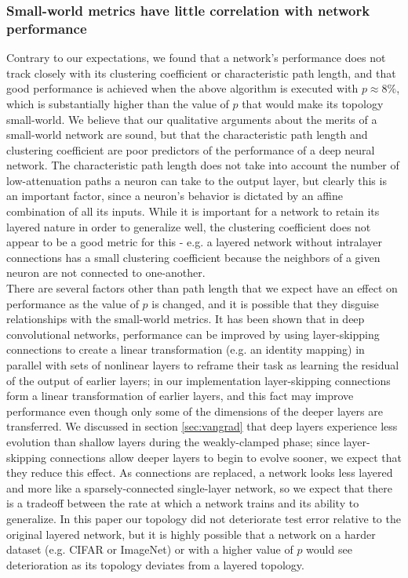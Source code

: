 \documentclass{article}
\newcommand{\npar}{\\\indent}
\begin{document}
\subsubsection{Small-world metrics have little correlation with network performance}
Contrary to our expectations, we found that a network's performance does not track closely with its clustering coefficient or characteristic path length, and that good performance is achieved when the above algorithm is executed with $p\approx 8\%$, which is substantially higher than the value of $p$ that would make its topology small-world. We believe that our qualitative arguments about the merits of a small-world network are sound, but that the characteristic path length and clustering coefficient are poor predictors of the performance of a deep neural network. The characteristic path length does not take into account the number of low-attenuation paths a neuron can take to the output layer, but clearly this is an important factor, since a neuron's behavior is dictated by an affine combination of all its inputs. While it is important for a network to retain its layered nature in order to generalize well, the clustering coefficient does not appear to be a good metric for this - e.g. a layered network without intralayer connections has a small clustering coefficient because the neighbors of a given neuron are not connected to one-another.
\npar
There are several factors other than path length that we expect have an effect on performance as the value of $p$ is changed, and it is possible that they disguise relationships with the small-world metrics. It has been shown \cite{he2015} that in deep convolutional networks, performance can be improved by using layer-skipping connections to create a linear transformation (e.g. an identity mapping) in parallel with sets of nonlinear layers to reframe their task as learning the residual of the output of earlier layers; in our implementation layer-skipping connections form a linear transformation of earlier layers, and this fact may improve performance even though only some of the dimensions of the deeper layers are transferred. We discussed in section \ref{sec:vangrad} that deep layers experience less evolution than shallow layers during the weakly-clamped phase; since layer-skipping connections allow deeper layers to begin to evolve sooner, we expect that they reduce this effect. As connections are replaced, a network looks less layered and more like a sparsely-connected single-layer network, so we expect that there is a tradeoff between the rate at which a network trains and its ability to generalize. In this paper our topology did not deteriorate test error relative to the original layered network, but it is highly possible that a network on a harder dataset (e.g. CIFAR or ImageNet) or with a higher value of $p$ would see deterioration as its topology deviates from a layered topology.
\end{document}
